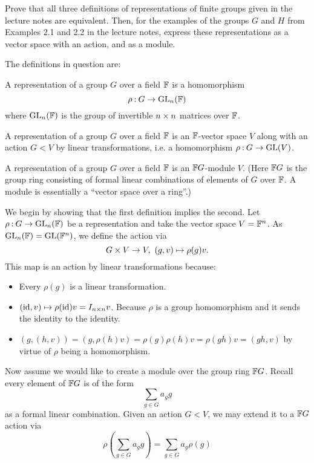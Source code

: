 \documentclass[12pt]{memoir}
\begin{document}
\begin{Ej}[Exercise 1]
    Prove that all three definitions of representations of finite groups given in the lecture notes are equivalent. Then, for the examples of the groups $G$ and $H$ from Examples 2.1 and 2.2 in the lecture notes, express these representations as a vector space with an action, and as a module.
\end{Ej}

The definitions in question are:

\begin{Def}
A representation of a group $G$ over a field $\mathbb{F}$ is a homomorphism 
$$\rho\mathbin{:} G\to\mathrm{GL}_n(\mathbb{F})$$
where $\mathrm{GL}_n(\mathbb{F})$ is the group of invertible $n\times n$ matrices over $\mathbb{F}$.
\end{Def}

\begin{Def}
A representation of a group $G$ over a field $\mathbb{F}$ is an $\mathbb{F}$-vector space $V$ along with an action $G\lt V$ by linear transformations, i.e. a homomorphism $\rho\mathbin{:} G\to\mathrm{GL}(V)$.
\end{Def}

\begin{Def}
A representation of a group $G$ over a field $\mathbb{F}$ is an $\mathbb{F} G$-module $V$. (Here $\mathbb{F} G$ is the group ring consisting of formal linear combinations of elements of $G$ over $\mathbb{F}$. A module is essentially a ``vector space over a ring''.)
\end{Def}

\begin{ptcbr}
We begin by showing that the first definition implies the second. Let $\rho\mathbin{:} G\to\mathrm{GL}_n(\mathbb{F})$ be a representation and take the vector space $V=\mathbb{F}^n$. As $\mathrm{GL}_n(\mathbb{F})=\mathrm{GL}(\mathbb{F}^n)$, we define the action via 
$$G\times V\to V,\ (g,v)\mapsto \rho(g)v.$$
This map is an action by linear transformations because:
\begin{itemize}
    \item Every $\rho(g)$ is a linear transformation. 
    \item $(\operatorname{id},v)\mapsto \rho(\operatorname{id})v=I_{n\times n}v$. Because $\rho$ is a group homomorphism and it sends the identity to the identity.
    \item $(g,(h,v))=(g,\rho(h)v)=\rho(g)\rho(h)v=\rho(gh)v=(gh,v)$ by virtue of $\rho$ being a homomorphism.
\end{itemize}

Now assume we would like to create a module over the group ring $\mathbb{F} G$. Recall every element of $\mathbb{F} G$ is of the form 
$$\sum_{g\in G}a_g g$$
as a formal linear combination. Given an action $G\lt V$, we may extend it to a $\mathbb{F} G$ action via
$$\rho\left(\sum_{g\in G}a_g g\right)=\sum_{g\in G}a_g \rho(g)$$
\end{ptcbr}
\end{document}

